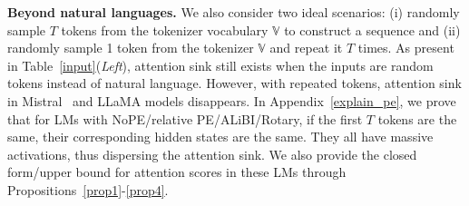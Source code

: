 \textbf{Beyond natural languages.} We also consider two ideal scenarios: (i) randomly sample $T$ tokens from the tokenizer vocabulary $\mathbb{V}$ to construct a sequence and (ii) randomly sample 1 token from the tokenizer $\mathbb{V}$ and repeat it $T$ times. As present in Table~\ref{input}(\emph{Left}), attention sink still exists when the inputs are random tokens instead of natural language. However, with repeated tokens, attention sink in Mistral~\citep{jiang2023mistral} and LLaMA models disappears. In Appendix~\ref{explain_pe}, we prove that for LMs with NoPE/relative PE/ALiBI/Rotary, if the first $T$ tokens are the same, their corresponding hidden states are the same. They all have massive activations, thus dispersing the attention sink. We also provide the closed form/upper bound for attention scores in these LMs through Propositions~\ref{prop1}-\ref{prop4}.


